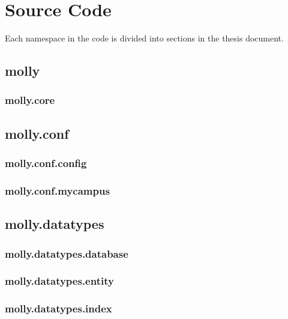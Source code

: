 
\chapter{Source Code}
		Each namespace in the code is divided into sections in the thesis document.
		
		\section{molly}
			\subsection{molly.core}
		
		\clearpage
		\section{molly.conf}
			\subsection{molly.conf.config}
				
			\clearpage
			\subsection{molly.conf.mycampus}
		
		\clearpage
		\section{molly.datatypes}
			\subsection{molly.datatypes.database}
		
			\clearpage
			\subsection{molly.datatypes.entity}
		
			\clearpage
			\subsection{molly.datatypes.index}
		
